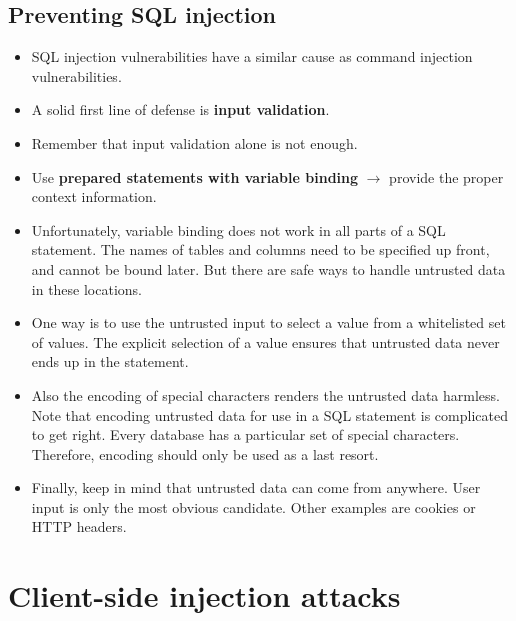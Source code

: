 \documentclass[../main.tex]{subfiles}
\begin{document}
\subsection{Preventing SQL injection}
\begin{itemize}
\item SQL injection vulnerabilities have a similar cause as command injection vulnerabilities.
\item A solid first line of defense is \textbf{input validation}.
\item Remember that input validation alone is not enough.
\item Use \textbf{prepared statements with variable binding} $\rightarrow$ provide the proper context information.
\item Unfortunately, variable binding does not work in all parts of a SQL statement. The names of tables and columns need to be specified up front, and cannot be bound later. But there are safe ways to handle untrusted data in these locations.
\item One way is to use the untrusted input to select a value from a whitelisted set of values. The explicit selection of a value ensures that untrusted data never ends up in the statement.
\item Also the encoding of special characters renders the untrusted data harmless. Note that encoding untrusted data for use in a SQL statement is complicated to get right. Every database has a particular set of special characters. Therefore, encoding should only be used as a last resort.
\item Finally, keep in mind that untrusted data can come from anywhere. User input is only the most obvious candidate. Other examples are cookies or HTTP headers.
\end{itemize}

\section{Client-side injection attacks}
\end{document}
